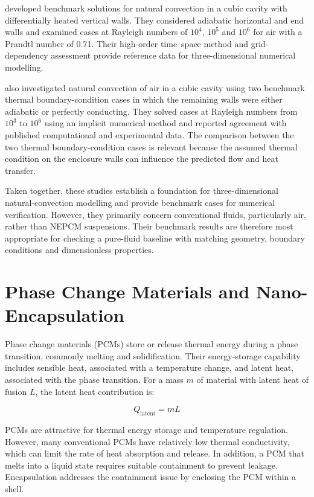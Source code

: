 \citet{wakashima2004} developed benchmark solutions for natural convection in a cubic cavity with differentially heated vertical walls. They considered adiabatic horizontal and end walls and examined cases at Rayleigh numbers of \(10^4\), \(10^5\) and \(10^6\) for air with a Prandtl number of 0.71. Their high-order time--space method and grid-dependency assessment provide reference data for three-dimensional numerical modelling.

\citet{bennett2006} also investigated natural convection of air in a cubic cavity using two benchmark thermal boundary-condition cases in which the remaining walls were either adiabatic or perfectly conducting. They solved cases at Rayleigh numbers from \(10^3\) to \(10^6\) using an implicit numerical method and reported agreement with published computational and experimental data. The comparison between the two thermal boundary-condition cases is relevant because the assumed thermal condition on the enclosure walls can influence the predicted flow and heat transfer.

Taken together, these studies establish a foundation for three-dimensional natural-convection modelling and provide benchmark cases for numerical verification. However, they primarily concern conventional fluids, particularly air, rather than NEPCM suspensions. Their benchmark results are therefore most appropriate for checking a pure-fluid baseline with matching geometry, boundary conditions and dimensionless properties.

\section{Phase Change Materials and Nano-Encapsulation}

Phase change materials (PCMs) store or release thermal energy during a phase transition, commonly melting and solidification. Their energy-storage capability includes sensible heat, associated with a temperature change, and latent heat, associated with the phase transition. For a mass \(m\) of material with latent heat of fusion \(L\), the latent heat contribution is:

\begin{equation}
    Q_{\mathrm{latent}} = mL
\end{equation}

PCMs are attractive for thermal energy storage and temperature regulation. However, many conventional PCMs have relatively low thermal conductivity, which can limit the rate of heat absorption and release. In addition, a PCM that melts into a liquid state requires suitable containment to prevent leakage. Encapsulation addresses the containment issue by enclosing the PCM within a shell.

